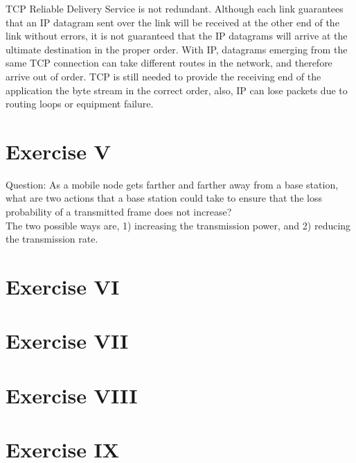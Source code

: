 \documentclass[11pt]{article}
\begin{document}
	TCP Reliable Delivery Service is not redundant. Although each link guarantees that an IP datagram sent over the link will be received at the other end of the link without errors, it is not guaranteed that the IP datagrams will arrive at the ultimate destination in the proper order. With IP, datagrams emerging from the same TCP connection can take different routes in the network, and therefore arrive out of order. TCP is still needed to provide the receiving end of the application the byte stream in the correct order, also, IP can lose packets due to routing loops or equipment failure.
	
	\section*{Exercise V}
	Question: 
	As a mobile node gets farther and farther away from a base station, what are two actions that a base station could take to ensure that the loss probability of a transmitted frame does not increase?\\
	
	The two possible ways are, 1) increasing the transmission power, and 2) reducing the transmission rate.
	\section*{Exercise VI}
	\section*{Exercise VII}	
	\section*{Exercise VIII}
	\section*{Exercise IX}
\end{document}
